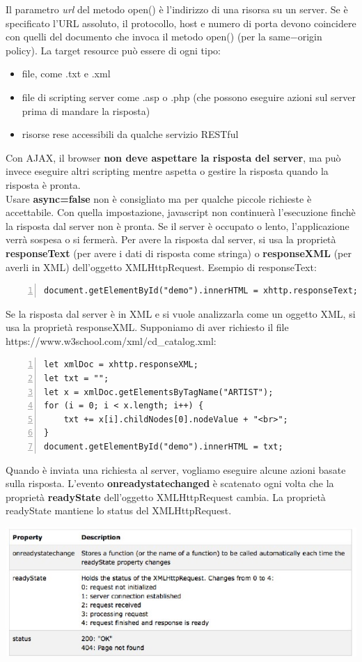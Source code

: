 Il parametro \emph{url} del metodo open() è l'indirizzo di una risorsa su un server. Se è specificato l'URL assoluto, il protocollo, host e numero di porta devono coincidere con quelli del documento che invoca il metodo open() (per la same$-$origin policy). La target resource può essere di ogni tipo:
\begin{itemize}
    \item file, come .txt e .xml
    \item file di scripting server come .asp o .php (che possono eseguire azioni sul server prima di mandare la risposta) 
    \item risorse rese accessibili da qualche servizio RESTful
\end{itemize}
Con AJAX, il browser \textbf{non deve aspettare la risposta del server}, ma può invece eseguire altri scripting mentre aspetta o gestire la risposta quando la risposta è pronta. \\
Usare \textbf{async=false} non è consigliato ma per qualche piccole richieste è accettabile. Con quella impostazione, javascript non continuerà l'esecuzione finchè la risposta dal server non è pronta. Se il server è occupato o lento, l'applicazione verrà sospesa o si fermerà.
Per avere la risposta dal server, si usa la proprietà \textbf{responseText} (per avere i dati di risposta come stringa) o \textbf{responseXML} (per averli in XML) dell'oggetto XMLHttpRequest. Esempio di responseText:
\begin{Verbatim}[frame = single, numbers = left]
document.getElementById("demo").innerHTML = xhttp.responseText;
\end{Verbatim}
Se la risposta dal server è in XML e si vuole analizzarla come un oggetto XML, si usa la proprietà responseXML. Supponiamo di aver richiesto il file https://www.w3school.com/xml/cd\_catalog.xml:
\begin{Verbatim}[frame = single, numbers = left]
let xmlDoc = xhttp.responseXML;
let txt = "";
let x = xmlDoc.getElementsByTagName("ARTIST");
for (i = 0; i < x.length; i++) {
    txt += x[i].childNodes[0].nodeValue + "<br>";
}
document.getElementById("demo").innerHTML = txt;
\end{Verbatim}
Quando è inviata una richiesta al server, vogliamo eseguire alcune azioni basate sulla risposta. L'evento \textbf{onreadystatechanged} è scatenato ogni volta che la proprietà \textbf{readyState} dell'oggetto XMLHttpRequest cambia. La proprietà readyState mantiene lo status del XMLHttpRequest.
\begin{center}
    \includegraphics[scale=0.8]{Images/TecnologieWeb/8/SetRequestEvent.jpg}
\end{center}

